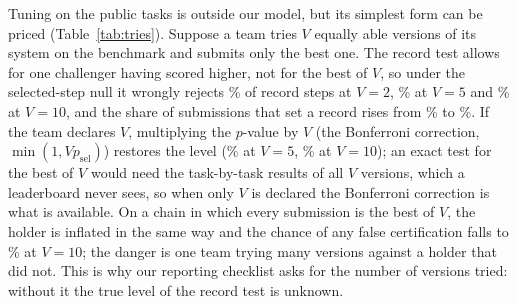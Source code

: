 \documentclass[11pt]{article}
\begin{document}
Tuning on the public tasks is outside our model, but its simplest form can be priced (Table~\ref{tab:tries}).
Suppose a team tries $V$ equally able versions of its system on the benchmark and submits only the best one.
The record test allows for one challenger having scored higher, not for the best of $V$, so under the selected-step null it wrongly rejects \NumTriesSizeTwo\% of record steps at $V=2$, \NumTriesSizeFive\% at $V=5$ and \NumTriesSizeTen\% at $V=10$, and the share of submissions that set a record rises from \NumTriesRecOne\% to \NumTriesRecTen\%.
If the team declares $V$, multiplying the $p$-value by $V$ (the Bonferroni correction, $\min(1,Vp_{\mathrm{sel}})$) restores the level (\NumTriesCorrFive\% at $V=5$, \NumTriesCorrTen\% at $V=10$); an exact test for the best of $V$ would need the task-by-task results of all $V$ versions, which a leaderboard never sees, so when only $V$ is declared the Bonferroni correction is what is available.
On a chain in which every submission is the best of $V$, the holder is inflated in the same way and the chance of any false certification falls to \NumTriesFwerTen\% at $V=10$; the danger is one team trying many versions against a holder that did not.
This is why our reporting checklist asks for the number of versions tried: without it the true level of the record test is unknown.

\begin{table}[t]
\centering\small

\caption{The record test when the submission is the best of $V$ equally able private tries on the same tasks (fitted Verified model, 500 tasks). Selected-step null: share of submissions that set a record, and how often the selective test and the $V$-corrected test wrongly reject among them. Global null: share of boards with at least one false certification, on 40-submission chains in which every submission is the best of $V$.}
\label{tab:tries}
\end{table}

\begin{table}[t]
\centering\small

\caption{False-rejection rate of the record test when systems have repository-specific strengths ($\tau$ on the logit scale): selected-step null on Verified's repositories, \NumClusterPairs{} pairs per level. SE ratio: mean ratio of the repository-level to the task-level standard error of the paired difference; the real board's median for neighbouring top-10 pairs is \NumClusterRealSe.}
\label{tab:clustersim}
\end{table}
\end{document}
